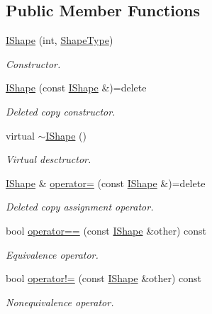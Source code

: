 \subsection*{Public Member Functions}
\begin{DoxyCompactItemize}
\item 
\mbox{\hyperlink{class_i_shape_a236c00619f1fa2eaab6c4ce85a2375aa}{I\+Shape}} (int, \mbox{\hyperlink{class_i_shape_a8f50993477b5ddb44c0547ef3d547cdc}{Shape\+Type}})
\begin{DoxyCompactList}\small\item\em Constructor. \end{DoxyCompactList}\item 
\mbox{\hyperlink{class_i_shape_a0671306e1665998f9c6652cf1ef1a74e}{I\+Shape}} (const \mbox{\hyperlink{class_i_shape}{I\+Shape}} \&)=delete
\begin{DoxyCompactList}\small\item\em Deleted copy constructor. \end{DoxyCompactList}\item 
virtual \mbox{\hyperlink{class_i_shape_aec9c445c0213374af733e2038d702630}{$\sim$\+I\+Shape}} ()
\begin{DoxyCompactList}\small\item\em Virtual desctructor. \end{DoxyCompactList}\item 
\mbox{\hyperlink{class_i_shape}{I\+Shape}} \& \mbox{\hyperlink{class_i_shape_ab21aa52b87b2544a934ebdf51aba87ff}{operator=}} (const \mbox{\hyperlink{class_i_shape}{I\+Shape}} \&)=delete
\begin{DoxyCompactList}\small\item\em Deleted copy assignment operator. \end{DoxyCompactList}\item 
bool \mbox{\hyperlink{class_i_shape_a066b575cba3e0c3f8c6c80fba9ca2734}{operator==}} (const \mbox{\hyperlink{class_i_shape}{I\+Shape}} \&other) const
\begin{DoxyCompactList}\small\item\em Equivalence operator. \end{DoxyCompactList}\item 
bool \mbox{\hyperlink{class_i_shape_a1f34ccaa57da81f897bbff476d0ba3ac}{operator!=}} (const \mbox{\hyperlink{class_i_shape}{I\+Shape}} \&other) const
\begin{DoxyCompactList}\small\item\em Nonequivalence operator. \end{DoxyCompactList}\item 

\end{DoxyCompactItemize}
